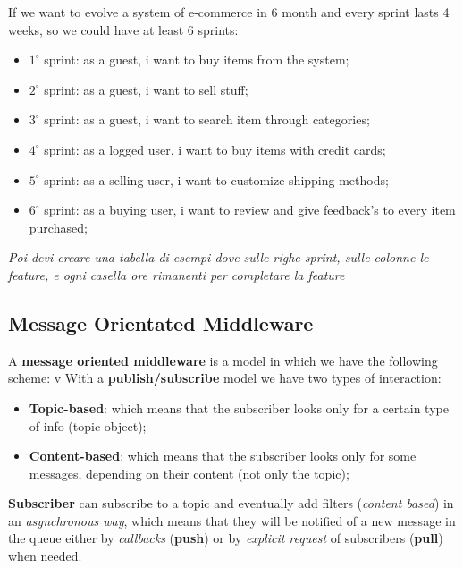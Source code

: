 \documentclass{article}
\begin{document}
If we want to evolve a system of e-commerce in 6 month and every sprint lasts 4 weeks, so we could have at least 6 sprints:
\begin{itemize}
\item $1^{\circ}$ sprint: as a guest, i want to buy items from the system;
\item $2^{\circ}$ sprint: as a guest, i want to sell stuff;
\item $3^{\circ}$ sprint: as a guest, i want to search item through categories;
\item $4^{\circ}$ sprint: as a logged user, i want to buy items with credit cards;
\item $5^{\circ}$ sprint: as a selling user, i want to customize shipping methods;
\item $6^{\circ}$ sprint: as a buying user, i want to review and give feedback's to every item purchased; 
\end{itemize}
\emph{Poi devi creare una tabella di esempi dove sulle righe sprint, sulle colonne le feature, e ogni casella ore rimanenti per completare la feature}
\subsection{Message Orientated Middleware}
A \textbf{message oriented middleware} is a model in which we have the following scheme:
v
With a \textbf{publish/subscribe} model we have two types of interaction:
\begin{itemize}
\item \textbf{Topic-based}: which means that the subscriber looks only for a certain type of info (topic object);
\item \textbf{Content-based}: which means that the subscriber looks only for some messages, depending on their content (not only the topic);
\end{itemize}
\textbf{Subscriber} can subscribe to a topic and eventually add filters (\emph{content based}) in an \emph{asynchronous way}, which means that they will be notified of a new message in the queue either by \emph{callbacks} (\textbf{push}) or by \emph{explicit request} of subscribers (\textbf{pull}) when needed. 
\end{document}
